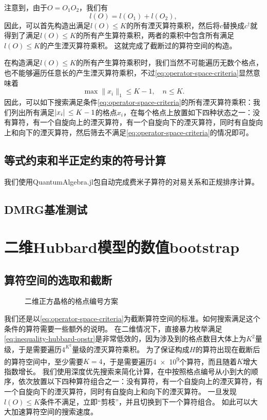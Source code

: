 \documentclass[oneside]{fduthesis}
\begin{document}
注意到，由于$O = O_1 O_2$，我们有
\begin{equation}
    l(O) = l(O_1) + l(O_2),
\end{equation}
因此，可以首先构造出满足$l(O) \leq K$的所有湮灭算符乘积，然后将$c$替换成$c^\dagger$就得到了满足$l(O) \leq K$的所有产生算符乘积，两者的乘积中包含所有满足$l(O) \leq K$的产生湮灭算符乘积。
这就完成了截断过的算符空间的构造。

在构造满足$l(O) \leq K$的所有产生算符乘积时，我们当然不可能遍历无数个格点，也不能够遍历任意长的产生湮灭算符乘积，不过\eqref{eq:operator-space-criteria}显然意味着
\begin{equation}
    \max \| x_i \|_1 \leq K - 1, \quad n \leq K.
    \label{eq:inequality-hubbard-opstr}
\end{equation}
因此，可以如下搜索满足条件\eqref{eq:operator-space-criteria}的所有湮灭算符乘积：我们列出所有满足$\abs*{x_i} \leq K - 1$的格点$x_i$，在每个格点上放置如下四种状态之一：没有算符，有一个自旋向上的湮灭算符，有一个自旋向下的湮灭算符，同时有自旋向上和向下的湮灭算符，然后筛去不满足\eqref{eq:operator-space-criteria}的情况即可。

\subsection{等式约束和半正定约束的符号计算}\label{sec:symbolic-hubbard}

我们使用QuantumAlgebra.jl包\cite{Sanchez-Barquilla2020,QuantumAlgebra.jl}自动完成费米子算符的对易关系和正规排序计算。

\subsection{DMRG基准测试}

\section{二维Hubbard模型的数值bootstrap}

\subsection{算符空间的选取和截断}

\begin{figure}
    \centering
    
    \caption{二维正方晶格的格点编号方案}
    \label{fig:site-index-2d}
\end{figure}

我们还是以\eqref{eq:operator-space-criteria}为截断算符空间的标准。如何搜索满足这个条件的算符需要一些额外的说明。
在二维情况下，直接暴力枚举满足\eqref{eq:inequality-hubbard-opstr}是非常低效的，因为涉及到的格点数目大体上为$K^2$量级，于是需要遍历$4^{K^2}$量级的湮灭算符乘积。
为了保证构成$H$的算符出现在截断后的算符空间中，至少需要$K=4$，于是需要遍历\num{4e9}个算符，而且随着$K$增大指数增长。
我们使用深度优先搜索来简化计算，在中按照格点编号从小到大的顺序，依次放置以下四种算符组合之一：没有算符，有一个自旋向上的湮灭算符，有一个自旋向下的湮灭算符，同时有自旋向上和向下的湮灭算符。
一旦发现$l(O) \leq K$条件不满足，立即“剪枝”，并且切换到下一个算符组合。
如此可以大大加速算符空间的搜索速度。
\end{document}

